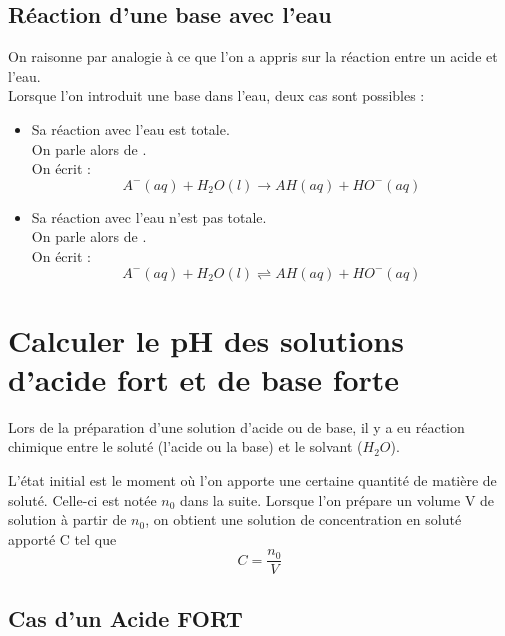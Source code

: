 \subsection{Réaction d'une base avec l'eau}

On raisonne par analogie à ce que l'on a appris sur la réaction entre un acide et l'eau.\\
Lorsque l'on introduit une base dans l'eau, deux cas sont possibles : 
\begin{itemize}
\item
Sa réaction avec l'eau est totale.\\On parle alors de .\\On écrit :  $$ A^-(aq) + H_2O(l) \longrightarrow AH(aq) + HO^{-}(aq)$$
\item 
Sa réaction avec l'eau n'est pas totale.\\
On parle alors de .\\On écrit :  $$ A^-(aq) + H_2O(l)\rightleftharpoons  AH(aq) + HO^{-}(aq)$$
\end{itemize}

\section{Calculer le pH des solutions d'acide fort et de base forte}

 Lors de la préparation d'une solution d'acide ou de base, il y a eu réaction chimique entre le soluté (l'acide ou la base) et le solvant ($H_2O$).

L'état initial est le moment où l'on apporte une certaine quantité de matière de soluté. Celle-ci est notée $n_0$ dans la suite. 
Lorsque l'on prépare un volume V de solution à partir de $n_0$, on obtient une solution de concentration en soluté apporté C tel que $$C=\frac{n_0}{V}$$


\subsection{Cas d'un Acide FORT}

